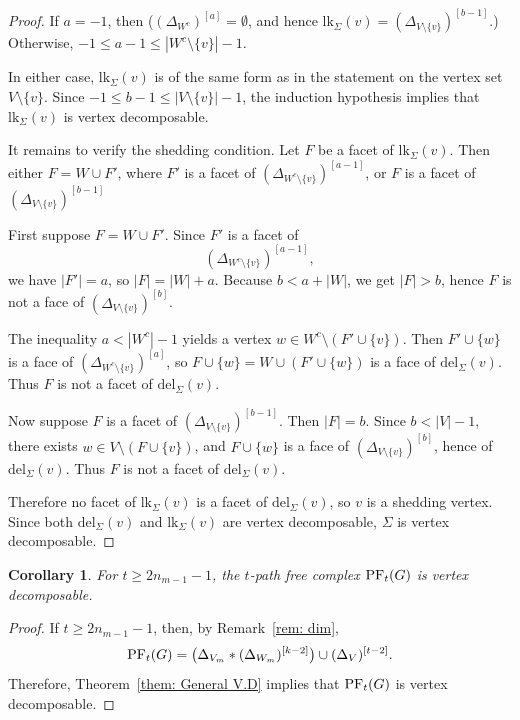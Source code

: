 \documentclass[12pt,reqno]{amsart}
\newtheorem{corollary}[corollary]{Corollary}
\theoremstyle{definition}
\newcommand{\lk}{{\mathrm{lk}}}
\newcommand{\del}{{\mathrm{del}}}
\newcommand{\PF}{{\rm PF}}
\begin{document}
\begin{proof}
If $a=-1$, then
($(\Delta_{W^c})^{[a]}=\emptyset$, and hence $\lk_\Sigma(v)=(\Delta_{V\setminus\{v\}})^{[b-1]}$.) Otherwise, $-1\le a-1\le |W^c\setminus\{v\}|-1$.

In either case, $\lk_\Sigma(v)$ is of the same form as in the statement on the vertex set $V\setminus\{v\}$. 
Since $-1\le b-1\le |V\setminus\{v\}|-1$, the induction hypothesis implies that $\lk_\Sigma(v)$ is vertex decomposable.

It remains to verify the shedding condition.
Let $F$ be a facet of $\lk_\Sigma(v)$. 
Then either $F=W\cup F'$, where $F'$ is a facet of  $(\Delta_{W^c\setminus\{v\}})^{[a-1]}$, or $F$ is a facet of $(\Delta_{V\setminus\{v\}})^{[b-1]}$

First suppose $F=W\cup F'$. Since $F'$ is a facet of
\[
(\Delta_{W^c\setminus\{v\}})^{[a-1]},
\]
we have $|F'|=a$, so $|F|=|W|+a$. Because $b<a+|W|$, we get $|F|>b$, hence $F$ is not a face of $(\Delta_{V\setminus\{v\}})^{[b]}$.

The inequality $a<|W^c|-1$ yields a vertex $w\in W^c\setminus(F'\cup\{v\})$. Then $F'\cup\{w\}$ is a face of $(\Delta_{W^c\setminus\{v\}})^{[a]}$, so $F\cup\{w\}=W\cup(F'\cup\{w\})$ is a face of $\del_\Sigma(v)$. Thus $F$ is not a facet of $\del_\Sigma(v)$.

Now suppose $F$ is a facet of $(\Delta_{V\setminus\{v\}})^{[b-1]}$. Then $|F|=b$. Since $b<|V|-1$, there exists $w\in V\setminus(F\cup\{v\})$, and $F\cup\{w\}$ is a face of $(\Delta_{V\setminus\{v\}})^{[b]}$, hence of $\del_\Sigma(v)$. Thus $F$ is not a facet of $\del_\Sigma(v)$.

Therefore no facet of $\lk_\Sigma(v)$ is a facet of $\del_\Sigma(v)$, so $v$ is a shedding vertex. Since both $\del_\Sigma(v)$ and $\lk_\Sigma(v)$ are vertex decomposable, $\Sigma$ is vertex decomposable.
\end{proof}

\begin{corollary}\label{Cor: V.D for particular case}
For $t \ge 2n_{m-1}-1$, the $t$-path free complex $\PF_t(G)$ is vertex decomposable. 
\end{corollary}
\begin{proof}
If $t \ge 2n_{m-1}-1$, then, by Remark~\ref{rem: dim},
\[
\PF_t(G)
=
\bigl(\Delta_{V_m} * (\Delta_{W_m})^{[k-2]}\bigr)
\cup
(\Delta_V)^{[t-2]}.
\]
Therefore, Theorem~\ref{them: General V.D} implies that $\PF_t(G)$ is vertex decomposable.

\end{proof}
\end{document}
